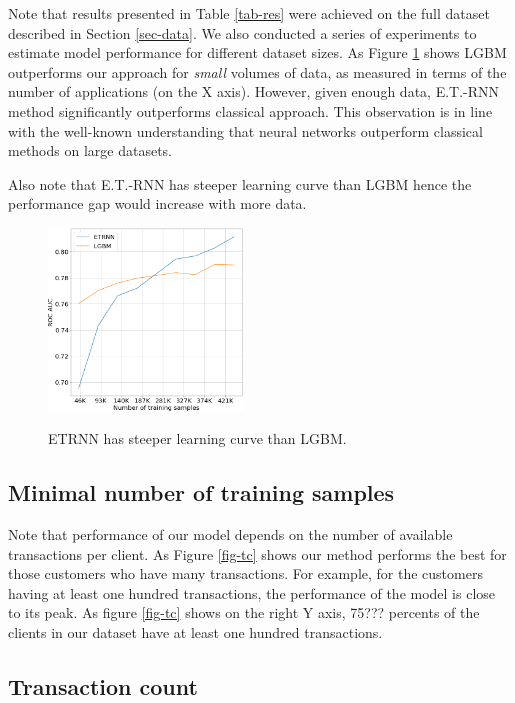 \documentclass[sigconf]{acmart}
\begin{document}
Note that results presented in Table \ref{tab-res} were achieved on the full dataset described in Section \ref{sec-data}. We also conducted a series of experiments to estimate model performance for different dataset sizes.
As Figure \ref{fig-lc} shows LGBM outperforms our approach for \textit{small} volumes of data, as measured in terms of the number of applications (on the X axis). However, given enough data, E.T.-RNN method significantly outperforms classical approach. This observation is in line with the well-known understanding that neural networks outperform classical methods on large datasets.

Also note that E.T.-RNN has steeper learning curve than LGBM hence the performance gap would increase with more data.

\begin{figure}[ht]
  \caption{ETRNN has steeper learning curve than LGBM.}
  \includegraphics[width=0.46\textwidth]{learning-curve.png}
  \label{fig-lc}
\end{figure}

\subsection{Minimal number of training samples}

Note that performance of our model depends on the number of available transactions per client. As Figure \ref{fig-tc} shows our method performs the best for those customers who have many transactions. For example, for the customers having at least one hundred transactions, the performance of the model is close to its peak. As figure \ref{fig-tc} shows on the right Y axis, 75??? percents of the clients in our dataset have at least one hundred transactions.

\subsection{Transaction count}
\end{document}
